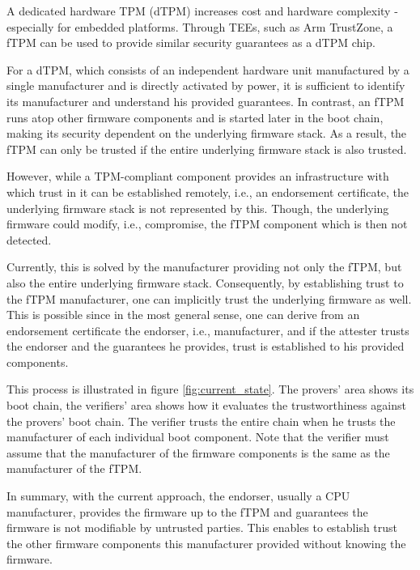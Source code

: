 A dedicated hardware \ac{TPM} (dTPM) increases cost and hardware complexity - especially for embedded platforms.
Through \acp{TEE}, such as Arm TrustZone, a \ac{fTPM} can be used to provide similar security guarantees as a dTPM chip.


For a \ac{dTPM}, which consists of an independent hardware unit manufactured by a single manufacturer and is directly activated by power, it is sufficient to identify its manufacturer and understand his provided guarantees.
In contrast, an \ac{fTPM} runs atop other firmware components and is started later in the boot chain, making its security dependent on the underlying firmware stack.
As a result, the fTPM can only be trusted if the entire underlying firmware stack is also trusted.


However, while a TPM-compliant component provides an infrastructure with which trust in it can be established remotely, i.e., an endorsement certificate, the underlying firmware stack is not represented by this.
Though, the underlying firmware could modify, i.e., compromise, the fTPM component which is then not detected.


Currently, this is solved by the manufacturer providing not only the fTPM, but also the entire underlying firmware stack.
Consequently, by establishing trust to the fTPM manufacturer, one can implicitly trust the underlying firmware as well.
This is possible since in the most general sense, one can derive from an endorsement certificate the endorser, i.e., manufacturer, and if the attester trusts the endorser and the guarantees he provides, trust is established to his provided components.



This process is illustrated in figure \autoref{fig:current_state}. The provers' area shows its boot chain, the verifiers' area shows how it evaluates the trustworthiness against the provers' boot chain. The verifier trusts the entire chain when he trusts the manufacturer of each individual boot component. Note that the verifier must assume that the manufacturer of the firmware components is the same as the manufacturer of the fTPM.



In summary, with the current approach, the endorser, usually a CPU manufacturer, provides the firmware up to the fTPM and guarantees the firmware is not modifiable by untrusted parties. This enables to establish trust the other firmware components this manufacturer provided without knowing the firmware.

